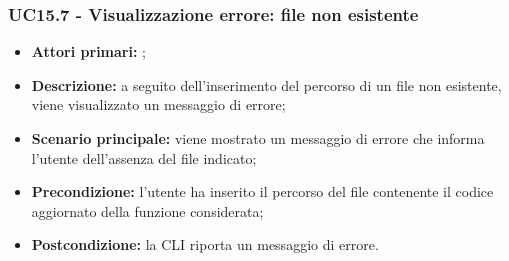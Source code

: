\subsubsection{UC15.7 - Visualizzazione errore: file non esistente}
\begin{itemize}
	\item \textbf{Attori primari:} \us{};
	\item \textbf{Descrizione:} a seguito dell’inserimento del percorso di un file non esistente, viene visualizzato un messaggio di errore;  
	\item \textbf{Scenario principale:} viene mostrato un messaggio di errore che informa l’utente dell’assenza del file indicato; 
	\item \textbf{Precondizione:} l’utente ha inserito il percorso del file contenente il codice aggiornato della funzione considerata;  
	\item \textbf{Postcondizione:} la CLI riporta un messaggio di errore. 
\end{itemize}